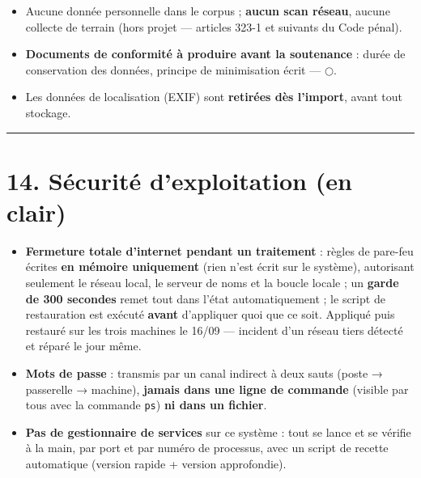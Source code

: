 \documentclass[11pt,a4paper]{article}
\newcommand{\afaire}{\textcolor{orange!85!black}{$\bigcirc$}}  %
\begin{document}
\begin{itemize}  \item Aucune donnée personnelle dans le corpus ; \textbf{aucun scan réseau}, aucune collecte de terrain (hors projet — articles 323-1 et suivants du Code pénal).
\end{itemize}

\begin{itemize}  \item \textbf{Documents de conformité à produire avant la soutenance} : durée de conservation des données, principe de minimisation écrit — \afaire.
\end{itemize}

\begin{itemize}  \item Les données de localisation (EXIF) sont \textbf{retirées dès l'import}, avant tout stockage.
\end{itemize}

\medskip\hrule\medskip
\section*{14. Sécurité d'exploitation (en clair)}
\begin{itemize}  \item \textbf{Fermeture totale d'internet pendant un traitement} : règles de pare-feu écrites \textbf{en mémoire uniquement} (rien n'est écrit sur le système), autorisant seulement le réseau local, le serveur de noms et la boucle locale ; un \textbf{garde de 300 secondes} remet tout dans l'état automatiquement ; le script de restauration est exécuté \textbf{avant} d'appliquer quoi que ce soit. Appliqué puis restauré sur les trois machines le 16/09 — incident d'un réseau tiers détecté et réparé le jour même.
\end{itemize}

\begin{itemize}  \item \textbf{Mots de passe} : transmis par un canal indirect à deux sauts (poste → passerelle → machine), \textbf{jamais dans une ligne de commande} (visible par tous avec la commande \texttt{ps}) \textbf{ni dans un fichier}.
\end{itemize}

\begin{itemize}  \item \textbf{Pas de gestionnaire de services} sur ce système : tout se lance et se vérifie à la main, par port et par numéro de processus, avec un script de recette automatique (version rapide + version approfondie).
\end{itemize}
\end{document}
